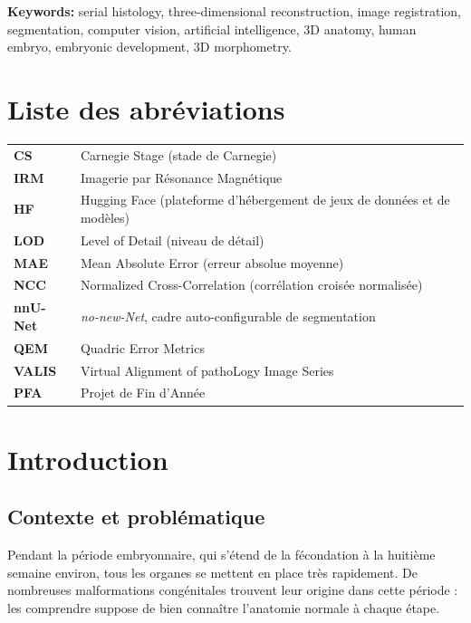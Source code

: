 \documentclass[12pt,a4paper]{report}
\begin{document}
\textbf{Keywords:} serial histology, three-dimensional reconstruction, image registration, segmentation, computer vision, artificial intelligence, 3D anatomy, human embryo, embryonic development, 3D morphometry.

\tableofcontents
\listoffigures
\listoftables

\chapter*{Liste des abréviations}
\begin{tabular}{@{}p{3.2cm}p{11cm}@{}}
\textbf{CS} & Carnegie Stage (stade de Carnegie) \\
\textbf{IRM} & Imagerie par Résonance Magnétique \\
\textbf{HF} & Hugging Face (plateforme d'hébergement de jeux de données et de modèles) \\
\textbf{LOD} & Level of Detail (niveau de détail) \\
\textbf{MAE} & Mean Absolute Error (erreur absolue moyenne) \\
\textbf{NCC} & Normalized Cross-Correlation (corrélation croisée normalisée) \\
\textbf{nnU-Net} & \textit{no-new-Net}, cadre auto-configurable de segmentation \\
\textbf{QEM} & Quadric Error Metrics \\
\textbf{VALIS} & Virtual Alignment of pathoLogy Image Series \\
\textbf{PFA} & Projet de Fin d'Année \\
\end{tabular}

\clearpage
{}
\setcounter{page}{1}

\chapter{Introduction}\label{ch:intro}

\section{Contexte et problématique}

Pendant la période embryonnaire, qui s'étend de la fécondation à la huitième semaine environ, tous les organes se mettent en place très rapidement. De nombreuses malformations congénitales trouvent leur origine dans cette période : les comprendre suppose de bien connaître l'anatomie normale à chaque étape.
\end{document}

